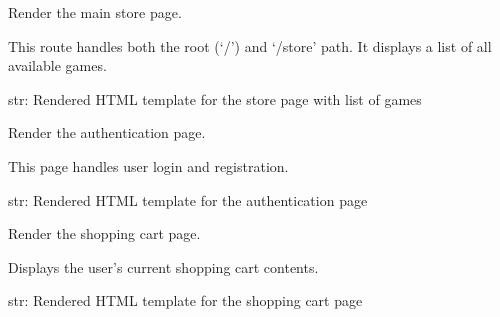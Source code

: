 \documentclass[letterpaper,10pt,english]{sphinxmanual}
\begin{document}
\begin{fulllineitems}
\label{\detokenize{store-service:routes.main_page}}
\pysigstartsignatures
\pysiglinewithargsret
{}
{}
{}
\pysigstopsignatures
\sphinxAtStartPar
Render the main store page.

\sphinxAtStartPar
This route handles both the root (‘/’) and ‘/store’ path.
It displays a list of all available games.
\begin{description}
\sphinxAtStartPar
str:  Rendered HTML template for the store page with list of games

\end{description}

\end{fulllineitems}


\begin{fulllineitems}
\label{\detokenize{store-service:routes.open_auth_page}}
\pysigstartsignatures
\pysiglinewithargsret
{}
{}
{}
\pysigstopsignatures
\sphinxAtStartPar
Render the authentication page.

\sphinxAtStartPar
This page handles user login and registration.
\begin{description}
\sphinxAtStartPar
str: Rendered HTML template for the authentication page

\end{description}

\end{fulllineitems}


\begin{fulllineitems}
\label{\detokenize{store-service:routes.open_cart_page}}
\pysigstartsignatures
\pysiglinewithargsret
{}
{}
{}
\pysigstopsignatures
\sphinxAtStartPar
Render the shopping cart page.

\sphinxAtStartPar
Displays the user’s current shopping cart contents.
\begin{description}
\sphinxAtStartPar
str: Rendered HTML template for the shopping cart page

\end{description}

\end{fulllineitems}
\end{document}
